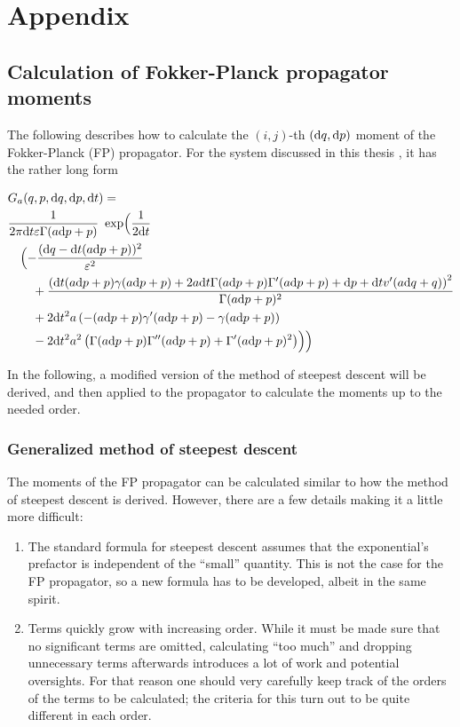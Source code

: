 \chapter{Appendix}

\section{Calculation of Fokker-Planck propagator moments}

The following describes how to calculate the \((i,j)\)-th \((\mathrm{d} q, \mathrm{d} p)\) moment of the Fokker-Planck (FP) propagator. For the system discussed in this thesis  , it has the rather long form

\begin{align*}
	&G_a(q,p,\mathrm{d} q,\mathrm{d} p,\mathrm{d} t) = \\
	& \frac1{2 \pi  \mathrm{d} t \varepsilon  \Gamma (a \mathrm{d} p +p)}
	  ~\operatorname{exp} \Bigl(\frac1{2 \mathrm{d} t} \\
	&\quad \Bigl(
		-\frac{(\mathrm{d} q-\mathrm{d} t (a \mathrm{d} p +p))^2}{\varepsilon ^2} \\
		&\qquad +\frac{\left(\mathrm{d} t (a \mathrm{d} p +p) \gamma (a \mathrm{d} p +p)+2 a \mathrm{d} t  \Gamma (a \mathrm{d} p +p) \Gamma '(a \mathrm{d} p +p)+\mathrm{d} p+\mathrm{d} t v'(a \mathrm{d} q+q)\right)^2}{\Gamma (a \mathrm{d} p +p)^2} \\
		&\qquad +2 \mathrm{d} t^2 a  \left(-(a \mathrm{d} p +p) \gamma '(a \mathrm{d} p +p)-\gamma (a \mathrm{d} p +p)\right) \\
		&\qquad -2 \mathrm{d} t^2 a ^2 \left(\Gamma (a \mathrm{d} p +p) \Gamma ''(a \mathrm{d} p +p)+\Gamma '(a \mathrm{d} p +p)^2\right)\Bigr)\Bigr)
\end{align*}

In the following, a modified version of the method of steepest descent will be derived, and then applied to the propagator to calculate the moments up to the needed order.


\subsection{Generalized method of steepest descent}

The moments of the FP propagator can be calculated similar to how the method of steepest descent is derived. However, there are a few details making it a little more difficult:

\begin{enumerate}
	\item The standard formula for steepest descent assumes that the exponential's prefactor is independent of the ``small'' quantity. This is not the case for the FP propagator, so a new formula has to be developed, albeit in the same spirit.
	\item Terms quickly grow with increasing order. While it must be made sure that no significant terms are omitted, calculating ``too much'' and dropping unnecessary terms afterwards introduces a lot of work and potential oversights. For that reason one should very carefully keep track of the orders of the terms to be calculated; the criteria for this turn out to be quite different in each order.
\end{enumerate}



